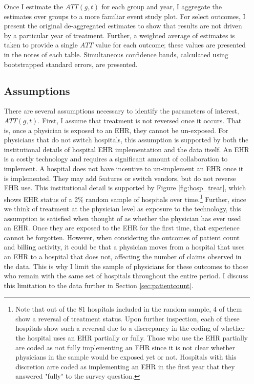 \documentclass[12pt]{article}
\begin{document}
Once I estimate the $ATT(g,t)$ for each group and year, I aggregate the estimates over groups to a more familiar event study plot. For select outcomes, I present the original de-aggregated estimates to show that results are not driven by a particular year of treatment.  Further, a weighted average of estimates is taken to provide a single $ATT$ value for each outcome; these values are presented in the notes of each table. Simultaneous confidence bands, calculated using bootstrapped standard errors, are presented. 

\subsection{Assumptions}

There are several assumptions necessary to identify the parameters of interest, $ATT(g,t)$. First, I assume that treatment is not reversed once it occurs. That is, once a physician is exposed to an EHR, they cannot be un-exposed. For physicians that do not switch hospitals, this assumption is supported by both the institutional details of hospital EHR implementation and the data itself. An EHR is a costly technology and requires a significant amount of collaboration to implement. A hospital does not have incentive to un-implement an EHR once it is implemented. They may add features or switch vendors, but do not reverse EHR use. This institutional detail is supported by Figure \ref{fig:hosp_treat}, which shows EHR status of a 2\% random sample of hospitals over time.\footnote{Note that out of the 81 hospitals included in the random sample, 4 of them show a reversal of treatment status. Upon further inspection, each of these hospitals show such a reversal due to a discrepancy in the coding of whether the hospital uses an EHR partially or fully. Those who use the EHR partially are coded as not fully implementing an EHR since it is not clear whether physicians in the sample would be exposed yet or not. Hospitals with this discretion arre coded as implementing an EHR in the first year that they answered "fully" to the survey question.} Further, since we think of treatment at the physician level as exposure to the technology, this assumption is satisfied when thought of as whether the physician has ever used an EHR. Once they are exposed to the EHR for the first time, that experience cannot be forgotten. However, when considering the outcomes of patient count and billing activity, it could be that a physician moves from a hospital that uses an EHR to a hospital that does not, affecting the number of claims observed in the data. This is why I limit the sample of physicians for these outcomes to those who remain with the same set of hospitals throughout the entire period. I discuss this limitation to the data further in Section \ref{sec:patientcount}.
\end{document}
